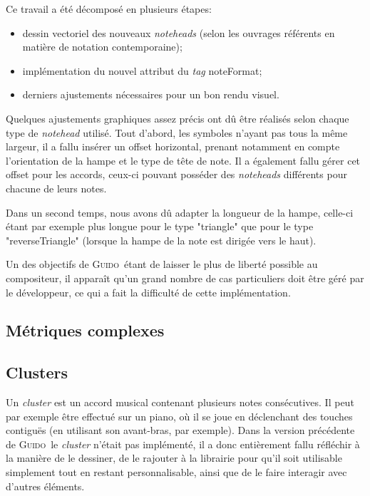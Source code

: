 \documentclass{article}
\newcommand{\guido}			{\textsc{Guido}}
\begin{document}
Ce travail a été décomposé en plusieurs étapes:
\begin{itemize}
    \item dessin vectoriel des nouveaux \emph{noteheads} (selon les ouvrages référents en matière de notation contemporaine);
    \item implémentation du nouvel attribut du \emph{tag} noteFormat;
    \item derniers ajustements nécessaires pour un bon rendu visuel.
\end{itemize}

Quelques ajustements graphiques assez précis ont dû être réalisés selon chaque type de \emph{notehead} utilisé. Tout d'abord, les symboles n'ayant pas tous la même largeur, il a fallu insérer un offset horizontal, prenant notamment en compte l'orientation de la hampe et le type de tête de note. Il a également fallu gérer cet offset pour les accords, ceux-ci pouvant posséder des \emph{noteheads} différents pour chacune de leurs notes.

Dans un second temps, nous avons dû adapter la longueur de la hampe, celle-ci étant par exemple plus longue pour le type "triangle" que pour le type "reverseTriangle" (lorsque la hampe de la note est dirigée vers le haut).

Un des objectifs de \guido\ étant de laisser le plus de liberté possible au compositeur, il apparaît qu'un grand nombre de cas particuliers doit être géré par le développeur, ce qui a fait la difficulté de cette implémentation.


\subsection{Métriques complexes}\label{subsec:metriques}



\subsection{Clusters}\label{subsec:clusters}

Un \emph{cluster} est un accord musical contenant plusieurs notes consécutives. Il peut par exemple être effectué sur un piano, où il se joue en déclenchant des touches contiguës (en utilisant son avant-bras, par exemple).
%
Dans la version précédente de \guido\, le \emph{cluster} n'était pas implémenté, il a donc entièrement fallu réfléchir à la manière de le dessiner, de le rajouter à la librairie pour qu'il soit utilisable simplement tout en restant personnalisable, ainsi que de le faire interagir avec d'autres éléments.
%
\\
%
%
\end{document}
